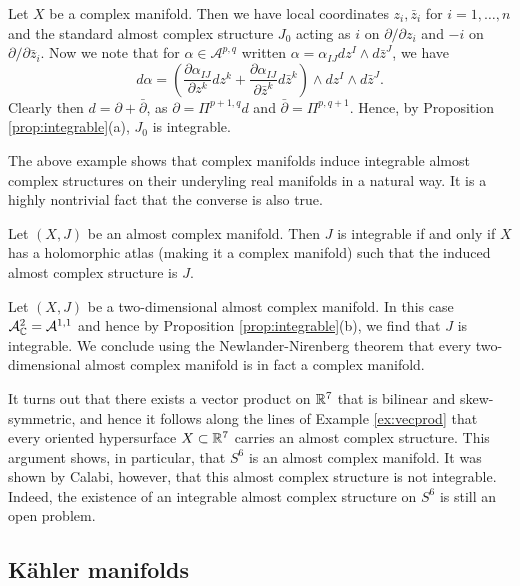\documentclass{amsart}
\begin{document}
\begin{example}
    Let $X$ be a complex manifold. Then we have local coordinates $z_i,\bar z_i$
    for $i=1,\ldots,n$ and the standard almost complex structure $J_0$ 
    acting as $i$ on $\partial/\partial z_i$ and $-i$ on $\partial/\partial\bar z_i$.
    Now we note that for $\alpha\in\mathcal{A}^{p,q}$ written $\alpha=\alpha_{IJ}dz^I\wedge d\bar z^J$,
    we have
    \begin{equation*}
        d\alpha = \left(\frac{\partial\alpha_{IJ}}{\partial z^k}dz^k+\frac{\partial\alpha_{IJ}}{\partial\bar z^k}d\bar z^k\right)\wedge dz^I\wedge d\bar z^J.
    \end{equation*}
    Clearly then $d=\partial + \bar\partial$, as $\partial=\Pi^{p+1,q}d$ and $\bar\partial=\Pi^{p,q+1}$.
    Hence, by Proposition \ref{prop:integrable}(a), $J_0$ is integrable.
\end{example}

The above example shows that complex manifolds induce integrable almost complex
structures on their underyling real manifolds in a natural way. It is a highly
nontrivial fact that the converse is also true.

\begin{theorem}
    Let $(X,J)$ be an almost complex manifold. Then $J$ is integrable if and only if
    $X$ has a holomorphic atlas (making it a complex manifold) such that the induced almost
    complex structure is $J$.
\end{theorem}

\begin{example}
    Let $(X,J)$ be a two-dimensional almost complex manifold. In this case
    $\mathcal{A}^2_{\mathbb{C}}=\mathcal{A}^{1,1}$ and hence by Proposition \ref{prop:integrable}(b),
    we find that $J$ is integrable. We conclude using the Newlander-Nirenberg theorem
    that every two-dimensional almost complex manifold is in fact a complex manifold.
\end{example}

\begin{example}
    It turns out that there exists a vector product on $\mathbb{R}^7$ that is bilinear and skew-symmetric,
    and hence it follows along the lines of Example \ref{ex:vecprod} that every oriented
    hypersurface $X\subset\mathbb{R}^7$ carries an almost complex structure. This argument shows, in
    particular, that $S^6$ is an almost complex manifold. It was shown by Calabi, however,
    that this almost complex structure is not integrable. Indeed, the existence of an integrable
    almost complex structure on $S^6$ is still an open problem.
\end{example}

\subsection{K\"ahler manifolds}
\end{document}
